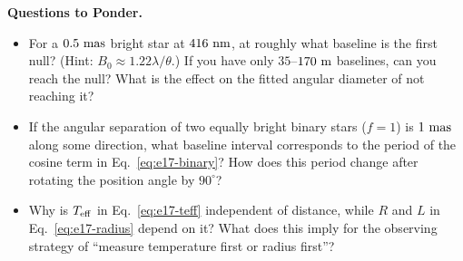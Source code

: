 \noindent\textbf{Questions to Ponder.}
\begin{itemize}
  \item For a \(0.5~{\rm mas}\) bright star at \(416~{\rm nm}\), at roughly what baseline is the first null? (Hint: \(B_0\approx1.22\lambda/\theta\).) If you have only \(35\)--\(170~{\rm m}\) baselines, can you reach the null? What is the effect on the fitted angular diameter of not reaching it?
  \item If the angular separation of two equally bright binary stars (\(f=1\)) is \(1~{\rm mas}\) along some direction, what baseline interval corresponds to the period of the cosine term in Eq.~\eqref{eq:e17-binary}? How does this period change after rotating the position angle by \(90^\circ\)?
  \item Why is \(T_{\rm eff}\) in Eq.~\eqref{eq:e17-teff} independent of distance, while \(R\) and \(L\) in Eq.~\eqref{eq:e17-radius} depend on it? What does this imply for the observing strategy of ``measure temperature first or radius first''?
\end{itemize}
